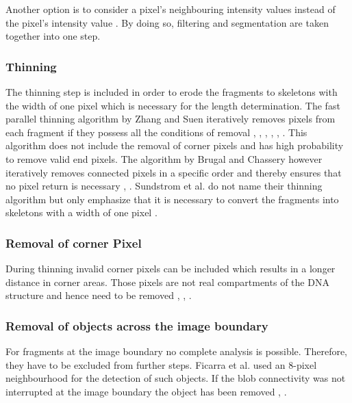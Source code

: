 \documentclass{article}
\begin{document}
Another option is to consider a pixel’s neighbouring intensity values instead of the pixel’s intensity value \cite{marek2005interactive}. By doing so, filtering and segmentation are taken together into one step.


\subsubsection{Thinning}
The thinning step is included in order to erode the fragments to skeletons with the width of one pixel which is necessary for the length determination. The fast parallel thinning algorithm by Zhang and Suen iteratively removes pixels from each fragment if they possess all the conditions of removal \cite{ficarra2005automated}, \cite{ficarra2002automated}, \cite{ficarra2005automatic}, \cite{spisz1998automated}, \cite{zhang1984fast}, \cite{marturelliautomated}. This algorithm does not include the removal of corner pixels and has high probability to remove valid end pixels. The algorithm by Brugal and Chassery however iteratively removes connected pixels in a specific order and thereby ensures that no pixel return is necessary \cite{brugal1977new}, \cite{sanchez2002accuracy}. Sundstrom et al. do not name their thinning algorithm but only emphasize that it is necessary to convert the fragments into skeletons with a width of one pixel \cite{sundstrom2012image}.


\subsubsection{Removal of corner Pixel}

During thinning invalid corner pixels can be included which results in a longer distance in corner areas. Those pixels are not real compartments of the DNA structure and hence need to be removed \cite{sanchez2002accuracy}, \cite{ficarra2002automated}, \cite{spisz1998automated}.

\subsubsection{Removal of objects across the image boundary}

For fragments at the image boundary no complete analysis is possible. Therefore, they have to be excluded from further steps. Ficarra et al. used an 8-pixel neighbourhood for the detection of such objects. If the blob connectivity was not interrupted at the image boundary the object has been removed \cite{ficarra2005automated}, \cite{ficarra2005automatic}. 
\end{document}
